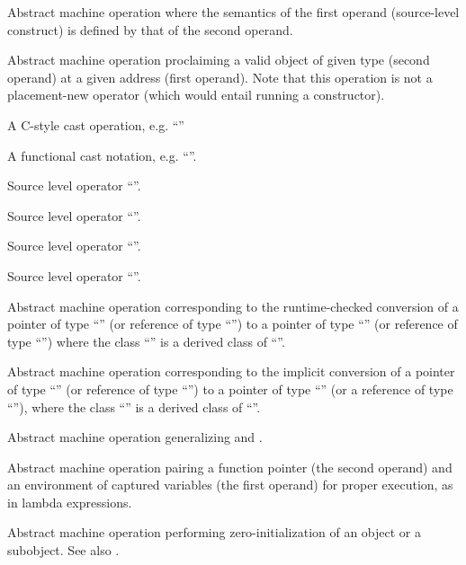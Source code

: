 Abstract machine operation where the semantics of the first operand (source-level construct) is defined by that of the second operand.

Abstract machine operation proclaiming a valid object of given type (second operand) at a given address (first operand).  
Note that this operation is not a placement-new operator (which would entail running a constructor).

A C-style cast operation, e.g. ``''

A functional cast notation, e.g. ``''.

Source level operator ``''.

Source level operator ``''.

Source level operator ``''.

Source level operator ``''.

Abstract machine operation corresponding to the runtime-checked conversion of a pointer of type ``'' 
(or reference of type ``'') to a pointer of type ``'' (or reference of type ``'')
where the class ``'' is a derived class of ``''.

Abstract machine operation corresponding to the implicit conversion of a pointer of type ``'' (or 
reference of type ``'') to a pointer of type ``'' (or a reference of type ``''),
where the class ``'' is a derived class of ``''.

Abstract machine operation generalizing  and .

Abstract machine operation pairing a function pointer (the second operand) and an environment of captured variables (the first operand) 
for proper execution, as in lambda expressions.

Abstract machine operation performing zero-initialization of an object or a subobject.
See also .

